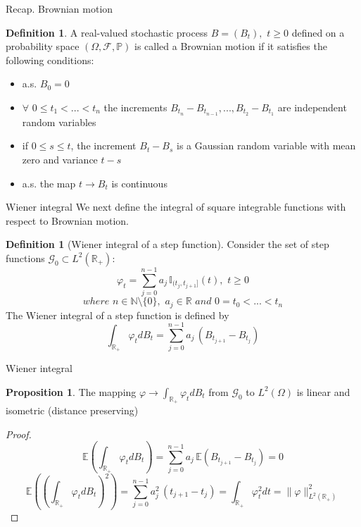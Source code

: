 \documentclass{beamer}%
\theoremstyle{definition}
\newtheorem{mydef}[theorem]{Definition}
\newtheorem{proposition}[theorem]{Proposition}
\begin{document}
\begin{frame}{Recap. Brownian motion}
\begin{mydef}
A real-valued stochastic process $B = (B_t), \,\,t\ge0$ defined on a probability space $(\Omega, \mathcal{F}, \mathbb{P})$ is called a Brownian motion if it satisfies the following conditions:
\begin{itemize}
    \item a.s. $B_0 = 0$ 
    \item $\forall \,\,0 \leq t_1 < ... < t_n$ the increments $B_{t_n} - B_{t_{n-1}},..., B_{t_2} - B_{t_{1}}$ are independent random variables
    \item if $0 \leq s \leq t$, the increment $B_t - B_s$ is a Gaussian random variable with mean zero and variance $t - s$
    \item a.s. the map $t \rightarrow B_t$ is continuous
\end{itemize}
\end{mydef}
\end{frame}

\begin{frame}{Wiener integral}
We next define the integral of square integrable functions with respect to Brownian motion.
\begin{mydef}[Wiener integral of a step function]
    Consider the set of step functions $\mathscr{G}_0 \subset L^2(\mathbb{R}_{+})$:
    $$\varphi_t = \sum_{j=0}^{n-1}a_j\,\mathbb{I}_{(t_j,t_{j+1}]}(t),\,\, t \ge 0$$
    $$where\,\, n \in \mathbb{N} \setminus \{0\}, \,\, a_j \in \mathbb{R} \,\, and \,\, 0 = t_0 < ... < t_n $$
    The Wiener integral of a step function is defined by
    $$\int_{\mathbb{R}_{+}}\varphi_tdB_t = \sum_{j=0}^{n-1}a_j\,(B_{t_{j+1}} - B_{t_j})$$
\end{mydef}

\end{frame}


\begin{frame}{Wiener integral}

\begin{proposition}
     The mapping  $\varphi \rightarrow \int_{\mathbb{R}_{+}}\varphi_tdB_t$ from $\mathscr{G}_0$ to $L^2(\Omega)$ is linear and isometric (distance preserving) \\
\end{proposition}
\begin{proof}
    $$\mathbb{E} \left(\int_{\mathbb{R}_{+}}\varphi_tdB_t \right) = \sum_{j=0}^{n-1}a_j\,\mathbb{E}(B_{t_{j+1}} - B_{t_j}) = 0$$
$$\mathbb{E} \left(\left(\int_{\mathbb{R}_{+}}\varphi_tdB_t \right)^2\right) = \sum_{j=0}^{n-1}a_j^2\,(t_{j+1} - t_j) = \int_{\mathbb{R}_{+}}\varphi_t^2dt = \|\varphi\|^2_{L^2(\mathbb{R}_{+})}$$
\end{proof}

\end{frame}
\end{document}

